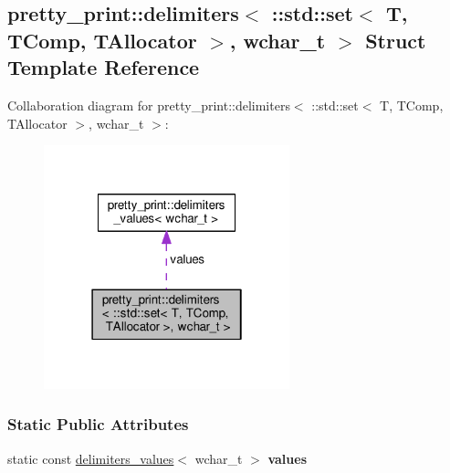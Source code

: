 \hypertarget{structpretty__print_1_1delimiters_3_01_1_1std_1_1set_3_01T_00_01TComp_00_01TAllocator_01_4_00_01wchar__t_01_4}{}\subsection{pretty\+\_\+print\+:\+:delimiters$<$ \+:\+:std\+:\+:set$<$ T, T\+Comp, T\+Allocator $>$, wchar\+\_\+t $>$ Struct Template Reference}
\label{structpretty__print_1_1delimiters_3_01_1_1std_1_1set_3_01T_00_01TComp_00_01TAllocator_01_4_00_01wchar__t_01_4}


Collaboration diagram for pretty\+\_\+print\+:\+:delimiters$<$ \+:\+:std\+:\+:set$<$ T, T\+Comp, T\+Allocator $>$, wchar\+\_\+t $>$\+:
\nopagebreak
\begin{figure}[H]
\begin{center}
\leavevmode
\includegraphics[width=202pt]{structpretty__print_1_1delimiters_3_01_1_1std_1_1set_3_01T_00_01TComp_00_01TAllocator_01_4_00_01wchar__t_01_4__coll__graph}
\end{center}
\end{figure}
\subsubsection*{Static Public Attributes}
\begin{DoxyCompactItemize}
\item 
static const \hyperlink{structpretty__print_1_1delimiters__values}{delimiters\+\_\+values}$<$ wchar\+\_\+t $>$ {\bfseries values}\hypertarget{structpretty__print_1_1delimiters_3_01_1_1std_1_1set_3_01T_00_01TComp_00_01TAllocator_01_4_00_01wchar__t_01_4_a992d0578f3ffaad60586f33f467c34eb}{}\label{structpretty__print_1_1delimiters_3_01_1_1std_1_1set_3_01T_00_01TComp_00_01TAllocator_01_4_00_01wchar__t_01_4_a992d0578f3ffaad60586f33f467c34eb}

\end{DoxyCompactItemize}


